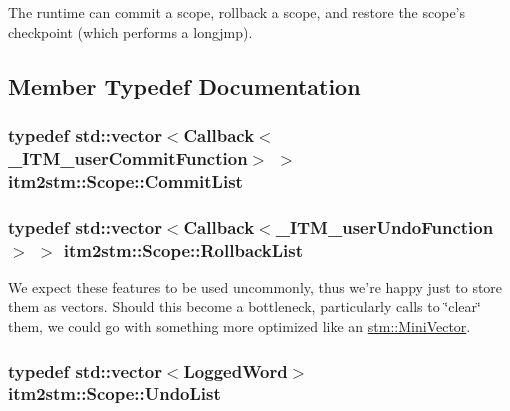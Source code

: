 The runtime can commit a scope, rollback a scope, and restore the scope's checkpoint (which performs a longjmp). 

\subsection{Member Typedef Documentation}
\hypertarget{classitm2stm_1_1Scope_ae7aad983e4d918844dae194d2eb98421}{
\subsubsection[{Commit\-List}]{\setlength{\rightskip}{0pt plus 5cm}typedef std\-::vector$<${\bf Callback}$<${\bf \-\_\-\-I\-T\-M\-\_\-user\-Commit\-Function}$>$ $>$ {\bf itm2stm\-::\-Scope\-::\-Commit\-List}\hspace{0.3cm}{\ttfamily [private]}}}\label{classitm2stm_1_1Scope_ae7aad983e4d918844dae194d2eb98421}
\hypertarget{classitm2stm_1_1Scope_af1a9d57c58c4dddb4f5d95f769e749d9}{
\subsubsection[{Rollback\-List}]{\setlength{\rightskip}{0pt plus 5cm}typedef std\-::vector$<${\bf Callback}$<${\bf \-\_\-\-I\-T\-M\-\_\-user\-Undo\-Function}$>$ $>$ {\bf itm2stm\-::\-Scope\-::\-Rollback\-List}\hspace{0.3cm}{\ttfamily [private]}}}\label{classitm2stm_1_1Scope_af1a9d57c58c4dddb4f5d95f769e749d9}
We expect these features to be used uncommonly, thus we're happy just to store them as vectors. Should this become a bottleneck, particularly calls to \char`\"{}clear\char`\"{} them, we could go with something more optimized like an \hyperlink{classstm_1_1MiniVector}{stm\-::\-Mini\-Vector}. \hypertarget{classitm2stm_1_1Scope_ab1ab8ebc4445367bfdccc48aa487cfab}{
\subsubsection[{Undo\-List}]{\setlength{\rightskip}{0pt plus 5cm}typedef std\-::vector$<${\bf Logged\-Word}$>$ {\bf itm2stm\-::\-Scope\-::\-Undo\-List}\hspace{0.3cm}{\ttfamily [private]}}}\label{classitm2stm_1_1Scope_ab1ab8ebc4445367bfdccc48aa487cfab}


